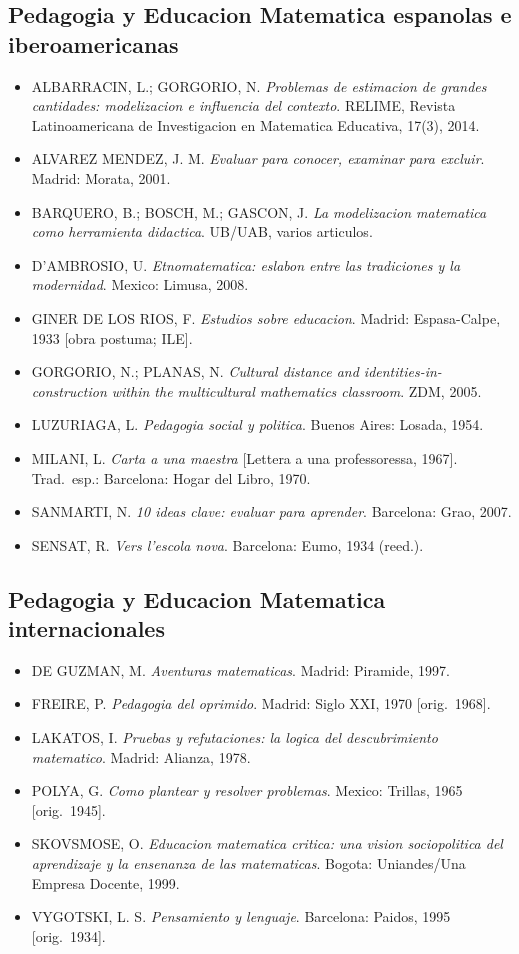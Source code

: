 \documentclass[12pt,a4paper]{scrartcl}
\begin{document}
\subsection{Pedagogia y Educacion Matematica espanolas e iberoamericanas}
\begin{itemize}[leftmargin=1.3em,itemsep=0.15em,topsep=0.3em]
  \item ALBARRACIN, L.; GORGORIO, N. \emph{Problemas de estimacion de grandes cantidades: modelizacion e influencia del contexto}. RELIME, Revista Latinoamericana de Investigacion en Matematica Educativa, 17(3), 2014.
  \item ALVAREZ MENDEZ, J. M. \emph{Evaluar para conocer, examinar para excluir}. Madrid: Morata, 2001.
  \item BARQUERO, B.; BOSCH, M.; GASCON, J. \emph{La modelizacion matematica como herramienta didactica}. UB/UAB, varios articulos.
  \item D'AMBROSIO, U. \emph{Etnomatematica: eslabon entre las tradiciones y la modernidad}. Mexico: Limusa, 2008.
  \item GINER DE LOS RIOS, F. \emph{Estudios sobre educacion}. Madrid: Espasa-Calpe, 1933 [obra postuma; ILE].
  \item GORGORIO, N.; PLANAS, N. \emph{Cultural distance and identities-in-construction within the multicultural mathematics classroom}. ZDM, 2005.
  \item LUZURIAGA, L. \emph{Pedagogia social y politica}. Buenos Aires: Losada, 1954.
  \item MILANI, L. \emph{Carta a una maestra} [Lettera a una professoressa, 1967]. Trad.\ esp.: Barcelona: Hogar del Libro, 1970.
  \item SANMARTI, N. \emph{10 ideas clave: evaluar para aprender}. Barcelona: Grao, 2007.
  \item SENSAT, R. \emph{Vers l'escola nova}. Barcelona: Eumo, 1934 (reed.).
\end{itemize}

\subsection{Pedagogia y Educacion Matematica internacionales}
\begin{itemize}[leftmargin=1.3em,itemsep=0.15em,topsep=0.3em]
  \item DE GUZMAN, M. \emph{Aventuras matematicas}. Madrid: Piramide, 1997.
  \item FREIRE, P. \emph{Pedagogia del oprimido}. Madrid: Siglo XXI, 1970 [orig.~1968].
  \item LAKATOS, I. \emph{Pruebas y refutaciones: la logica del descubrimiento matematico}. Madrid: Alianza, 1978.
  \item POLYA, G. \emph{Como plantear y resolver problemas}. Mexico: Trillas, 1965 [orig.~1945].
  \item SKOVSMOSE, O. \emph{Educacion matematica critica: una vision sociopolitica del aprendizaje y la ensenanza de las matematicas}. Bogota: Uniandes/Una Empresa Docente, 1999.
  \item VYGOTSKI, L. S. \emph{Pensamiento y lenguaje}. Barcelona: Paidos, 1995 [orig.~1934].
\end{itemize}
\end{document}
